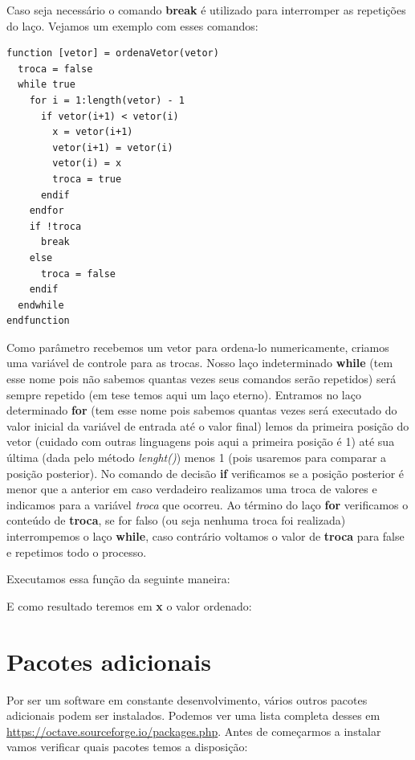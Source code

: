 \documentclass[a4paper,11pt]{article}
\begin{document}
Caso seja necessário o comando \textbf{break} é utilizado para interromper as repetições do laço. Vejamos um exemplo com esses comandos:
\begin{lstlisting}[]
function [vetor] = ordenaVetor(vetor)
  troca = false
  while true
    for i = 1:length(vetor) - 1
      if vetor(i+1) < vetor(i)
        x = vetor(i+1)
        vetor(i+1) = vetor(i)
        vetor(i) = x
        troca = true
      endif
    endfor
    if !troca
      break
    else
      troca = false
    endif
  endwhile
endfunction

\end{lstlisting}

Como parâmetro recebemos um vetor para ordena-lo numericamente, criamos uma variável de controle para as trocas. Nosso laço indeterminado \textbf{while} (tem esse nome pois não sabemos quantas vezes seus comandos serão repetidos) será sempre repetido (em tese temos aqui um laço eterno). Entramos no laço determinado \textbf{for} (tem esse nome pois sabemos quantas vezes será executado do valor inicial da variável de entrada até o valor final) lemos da primeira posição do vetor (cuidado com outras linguagens pois aqui a primeira posição é 1) até sua última (dada pelo método \textit{lenght()}) menos 1 (pois usaremos para comparar a posição posterior). No comando de decisão \textbf{if} verificamos se a posição posterior é menor que a anterior em caso verdadeiro realizamos uma troca de valores e indicamos para a variável \textit{troca} que ocorreu. Ao término do laço \textbf{for} verificamos o conteúdo de \textbf{troca}, se for falso (ou seja nenhuma troca foi realizada) interrompemos o laço \textbf{while}, caso contrário voltamos o valor de \textbf{troca} para false e repetimos todo o processo.

Executamos essa função da seguinte maneira: \\

E como resultado teremos em \textbf{x} o valor ordenado: \\
\codigo{[1, 2, 4, 5]}

\section{Pacotes adicionais}
Por ser um software em constante desenvolvimento, vários outros pacotes adicionais podem ser instalados. Podemos ver uma lista completa desses em \url{https://octave.sourceforge.io/packages.php}. Antes de começarmos a instalar vamos verificar quais pacotes temos a disposição: \\
\end{document}
